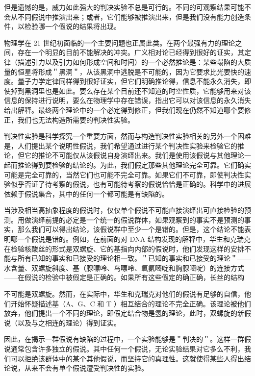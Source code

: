 但是遗憾的是，威力如此强大的判决实验不总是可行的。不同的可观察结果可能不会从不同假说中推演出来；或者，它们能够被推演出来，但是我们没有能力创造条件，以检验哪一个假说的结果将出现。

物理学在 21 世纪初面临的一个主要问题也正属此类。在两个最强有力的理论之间，存在一个明显的目前不能解决的冲突。广义相对论已经得到很好的证实，其定律（描述引力以及引力如何形成空间和时间）的一个必然推论是：某些塌陷的大质量的恒星将形成＂黑洞＂，从该黑洞中逃脱是不可能的，因为它要求比光要快的速度。量子力学定律同样得到很好证实，但它们明确推论得，信息不能永久消失，即使掉到黑洞里也是如此。要么存在某个目前还不知道的时空性质，它能够用来对该信息的保持进行说明，要么在物理学中存在错误，指出它可以对该信息的永久消失给出解释。最终两个理论中的一个必定得到修正，但我们现在仍然不知道哪个要修正，我们也无法构造所需要的判决性实验。\cite{hawking1974}

判决性实验是科学探究一个重要方面，然而与构造判决性实验相关的另外一个困难是，人们提出某个说明性假说，我们希望通过进行某个判决性实验来检验它的推论，但它的推论不可能仅从该假说自身演绎出来。我们是使用该假说与其他理论一起而推论得到要检验的结论的。为此，我们假定那些其他理论完全可靠。它们确实可能是完全可靠的，当然它们也可能不完全可靠。如果它们不可靠，即使判决性实验似乎否证了待考察的假说，也有可能待考察的假说恰恰是正确的。科学中的进展依赖于假说集合，其中的任何一个都可能是有缺陷的。

当涉及相当高抽象程度的假说时，仅仅单个假说不可能直接演绎出可直接检验的预测。用做演绎前提的必定是一个统一的假说群体，如果观察到的事实不是预测的事实，那么我们可以得出结论，该假说群中至少一个是错的。但是，这个结论不能表明哪一个假说是错的。例如，在前面的对 DNA 结构发现的解释中，华生和克瑞克在检验核酸丝的形式是双螺旋、它的基指向内部的假说时，他们发现这样的安排不能与所有已知的事实和已接受的理论相一致。＂已知的事实和已接受的理论＂——水含量、双螺旋斜度、基（腺嘌呤、鸟嘌呤、氧氨嘧啶和胸腺嘧啶）的连接方式——在假说的检验中被假定是正确的。如果所有这些假定的确正确，长丝的结构

不可能是双螺旋。然而，在实际中，华生和克瑞克对他们的假说有足够的自信，他们开始怀疑描述基（A、G、C 和 T ）相互结合的理论不完全正确。该理论被他们放弃，他们提出一个不同的理论，即假定结合物是氢的理论，此时，双螺旋的新假说（以及与之相连的理论）得到证实。

因此，在揭示一群假说有缺陷的过程中，一个实验能够是＂判决的＂。这样一群假说通常包含许多独立的假说。其中任何一个假说，无论实验结果对它多么不利，我们可以拒绝该群体中的某个其他假说，而坚持它的真理性。这就使得某些人得出结论说，从来不会有单个假说遭受判决性的实验。

